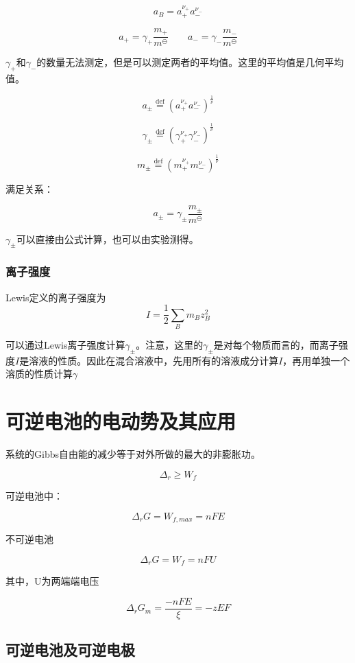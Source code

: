 \documentclass[a4paper]{ctexrep}
\begin{document}
    \[
        a_B = a_+^{\nu_+}a_-^{\nu_-}  
    \]

    \[
        a_+ = \gamma_+ \frac{m_+}{m^\ominus}  \qquad a_- = \gamma_-  \frac{m_-}{m^\ominus}  
    \]

    $\gamma_+$和$\gamma_-$的数量无法测定，但是可以测定两者的平均值。这里的平均值是几何平均值。

    \[
        a_\pm \overset{\mathrm{def}}{=} (a_+^{\nu_+}a_-^{\nu_-})^\frac{1}{\nu} 
    \]

    \[
        \gamma_\pm \overset{\mathrm{def}}{=} (\gamma_+^{\nu_+}\gamma_-^{\nu_-})^\frac{1}{\nu}   
    \]

    \[
        m_\pm \overset{\mathrm{def}}{=} (m_+^{\nu_+}m_-^{\nu_-})^\frac{1}{\nu}   
    \]

    满足关系：

    \[
        a_\pm = \gamma_\pm \frac{m_\pm}{m^\ominus}
    \]

    $\gamma_\pm$可以直接由公式计算，也可以由实验测得。

    \subsection{离子强度}

    Lewis定义的离子强度为
    \[
        I = \frac{1}{2} \sum\limits_{B} m_B z_B^2  
    \]

    可以通过Lewis离子强度计算$\gamma_\pm$。注意，这里的$\gamma_\pm$是对每个物质而言的，而离子强度$I$是溶液的性质。因此在混合溶液中，先用所有的溶液成分计算$I$，再用单独一个溶质的性质计算$\gamma$

    \chapter{可逆电池的电动势及其应用}

    系统的Gibbs自由能的减少等于对外所做的最大的非膨胀功。

    \[
        \Delta_r \geq W_f  
    \]

    可逆电池中：

    \[
        \Delta_r G = W_{f, max} = nFE  
    \]

    不可逆电池

    \[
        \Delta_r G = W_{f} = nFU 
    \]

    其中，U为两端端电压


    \[
        \Delta_r G_m = \frac{-nFE}{\xi} = -zEF
    \]

    \section{可逆电池及可逆电极}
\end{document}
